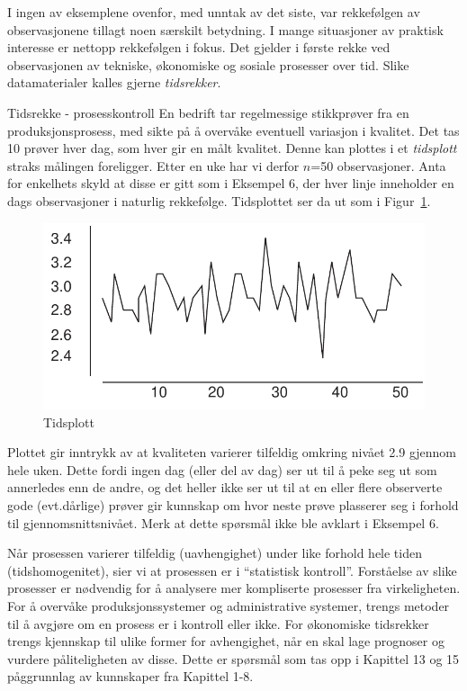 I ingen av eksemplene ovenfor, med unntak av det siste, var rekkefølgen av
observasjonene tillagt noen særskilt betydning.  I mange situasjoner av
praktisk interesse er nettopp rekkefølgen i fokus.  Det gjelder i
første rekke ved observasjonen av tekniske, økonomiske og sosiale
prosesser over tid.  Slike datamaterialer kalles gjerne {\em tidsrekker}.\\

\begin{eksempel}{Tidsrekke - prosesskontroll}
En bedrift tar regelmessige stikkprøver fra en produksjonsprosess, med
sikte på å overvåke eventuell variasjon i kvalitet.  Det tas 
10 prøver hver dag, som hver gir en målt kvalitet.  Denne kan plottes
i et {\em tidsplott} straks målingen foreligger.  Etter en uke har vi 
derfor $n$=50 observasjoner.  Anta for enkel\-hets skyld at disse er gitt som
i Eksempel 6, der hver linje inneholder en dags observasjoner i naturlig
rekkefølge.  Tidsplottet ser da ut som i Figur~\ref{fig:Tidsplott}. 

\begin{figure}[ht]
\centering \centering
\includegraphics[scale=0.8]{figurer/fig1_5.pdf}
\caption{Tidsplott}
	\label{fig:Tidsplott}
\end{figure}

Plottet gir inntrykk av at kvaliteten varierer tilfeldig omkring nivået
2.9 gjennom hele uken.  Dette fordi ingen dag (eller del av dag) ser ut til
å peke seg ut som annerledes enn de andre, og det heller ikke ser ut
til at en eller flere observerte gode (evt.dårlige) prøver gir
kunnskap om hvor neste prøve plasserer seg i forhold til 
gjennomsnittsnivået.  Merk at dette spørsmål ikke ble avklart
i Eksempel 6.

Når prosessen varierer tilfeldig (uavhengighet) under like forhold hele
tiden (tidshomogenitet), sier vi at prosessen er i ``statistisk kontroll''.
Forstå\-else av slike prosesser er nødvendig for å analysere mer
kompliserte pro\-sesser fra virkeligheten.  For å overvåke 
produksjonssystemer og administrative systemer, trengs metoder til å
avgjøre om en prosess er i kontroll eller ikke.  For økonomiske
tidsrekker trengs kjennskap til ulike former for avhengighet, når en
skal lage prognoser og vurdere påliteligheten av disse.  Dette er spørsmål
som tas opp i Kapittel 13 og 15 påggrunnlag av kunnskaper fra Kapittel 1-8.
\end{eksempel}

